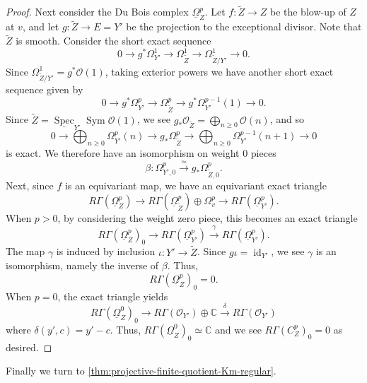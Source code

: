 \documentclass{amsart}
\theoremstyle{definition}
\newcommand{\CC}{\mathbb{C}}
\newcommand{\cO}{\mathcal{O}}
\DeclareMathOperator{\Sym}{Sym}
\DeclareMathOperator{\Spec}{Spec}
\DeclareMathOperator{\id}{id}
\begin{document}
\begin{proof}
    Next consider the Du Bois complex $\underline{\Omega}^p_Z$. Let $f\colon\widetilde{Z}\to Z$ be the blow-up of $Z$ at $v$, and let $g\colon\widetilde{Z}\to E=Y'$ be the projection to the exceptional divisor. Note that $\widetilde{Z}$ is smooth. Consider the short exact sequence
    \[
        0\to g^*\Omega^1_{Y'}\to\Omega^1_{\widetilde{Z}}\to\Omega^1_{\widetilde{Z}/Y'}\to0.
    \]
    Since $\Omega^1_{\widetilde{Z}/Y'}=g^*\cO(1)$, taking exterior powers we have another short exact sequence given by
    \[
        0\to g^*\Omega^p_{Y'}\to\Omega^p_{\widetilde{Z}}\to g^*\Omega^{p-1}_{Y'}(1)\to0.
    \]
    Since $\widetilde{Z}=\underline{\Spec}_{Y'}\Sym\cO(1)$, we see $g_*\cO_{\widetilde{Z}}=\bigoplus_{n\geq0}\cO(n)$, and so
    \[
        0\to \bigoplus_{n\geq0}\Omega^p_{Y'}(n)\to g_*\Omega^p_{\widetilde{Z}}\to \bigoplus_{n\geq0}\Omega^{p-1}_{Y'}(n+1)\to0
    \]
    is exact. We therefore have an isomorphism on weight $0$ pieces
    \[
        \beta\colon\Omega^p_{Y',0}\xrightarrow{\simeq} g_*\Omega^p_{\widetilde{Z},0}.
    \]
    Next, since $f$ is an equivariant map, we have an equivariant exact triangle
    \[
        R\Gamma(\underline{\Omega}^p_Z)\to R\Gamma(\underline{\Omega}^p_{\widetilde{Z}})\oplus\Omega^p_v\to R\Gamma(\underline{\Omega}^p_{Y'}).
    \]
    When $p>0$, by considering the weight zero piece, this becomes an exact triangle
    \[
        R\Gamma(\underline{\Omega}^p_Z)_0\to R\Gamma(\underline{\Omega}^p_{Y'})\xrightarrow{\gamma} R\Gamma(\underline{\Omega}^p_{Y'}).
    \]
    The map $\gamma$ is induced by inclusion $\iota\colon Y'\to\widetilde{Z}$. Since $g\iota=\id_{Y'}$, we see $\gamma$ is an isomorphism, namely the inverse of $\beta$. Thus, 
    \[
        R\Gamma(\underline{\Omega}^p_Z)_0=0.
    \]
    When $p=0$, the exact triangle yields
    \[
        R\Gamma(\underline{\Omega}^0_Z)_0\to R\Gamma(\cO_{Y'})\oplus\CC\xrightarrow{\delta} R\Gamma(\cO_{Y'})
    \]
    where $\delta(y',c)=y'-c$. Thus, $R\Gamma(\underline{\Omega}^0_Z)_0\simeq\CC$ and we see $R\Gamma(C^p_Z)_0=0$ as desired.
\end{proof}

Finally we turn to \autoref{thm:projective-finite-quotient-Km-regular}.
\end{document}
